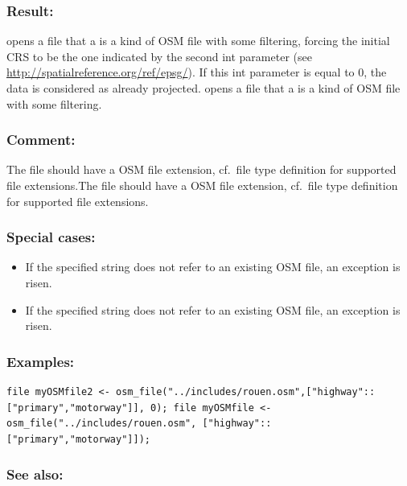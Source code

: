 \documentclass[]{book}
\providecommand{\tightlist}{%
  \setlength{\itemsep}{0pt}\setlength{\parskip}{0pt}}
\theoremstyle{definition}
\theoremstyle{definition}
\theoremstyle{definition}
\theoremstyle{remark}
\begin{document}
\subsubsection{Result:}\label{result-373}

opens a file that a is a kind of OSM file with some filtering, forcing
the initial CRS to be the one indicated by the second int parameter (see
\url{http://spatialreference.org/ref/epsg/}). If this int parameter is
equal to 0, the data is considered as already projected. opens a file
that a is a kind of OSM file with some filtering.

\subsubsection{Comment:}\label{comment-76}

The file should have a OSM file extension, cf.~file type definition for
supported file extensions.The file should have a OSM file extension,
cf.~file type definition for supported file extensions.

\subsubsection{Special cases:}\label{special-cases-107}

\begin{itemize}
\tightlist
\item
  If the specified string does not refer to an existing OSM file, an
  exception is risen.\\
\item
  If the specified string does not refer to an existing OSM file, an
  exception is risen.
\end{itemize}

\subsubsection{Examples:}\label{examples-265}

\begin{verbatim}
file myOSMfile2 <- osm_file("../includes/rouen.osm",["highway"::["primary","motorway"]], 0); file myOSMfile <- osm_file("../includes/rouen.osm", ["highway"::["primary","motorway"]]); 
\end{verbatim}

\subsubsection{See also:}\label{see-also-153}
\end{document}
